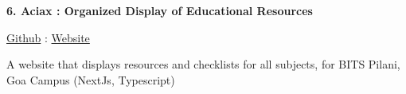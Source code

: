 \documentclass[10pt, letterpaper]{article}
\newenvironment{twocolentry}[2][]{
    \onecolentry
    \def\secondColumn{#2}
    \setcolumnwidth{\fill, 4.7 cm} %
    \begin{paracol}{2}
}{
    \switchcolumn \raggedleft \secondColumn
    \end{paracol}
    \endonecolentry
}
\begin{document}
        \vspace{0.3 cm} %

        \begin{twocolentry}{
            \href{https://github.com/Darelife/aciax}{Github} : \href{https://aciax.vercel.app/}{Website}
        }
            \textbf{6. Aciax : Organized Display of Educational Resources}
        \end{twocolentry}

        \vspace{0.15 cm} %
        A website that displays resources and checklists for all subjects, for BITS Pilani, Goa Campus (NextJs, Typescript)

        \vspace{0.4 cm} %
\end{document}
